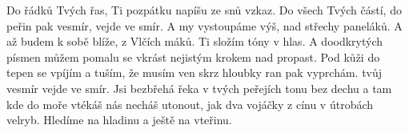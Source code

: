 \ve{}
Do řádků Tvých řas,
Ti pozpátku napíšu ze snů vzkaz.
Do všech Tvých částí,
do peřin pak vesmír,
vejde ve smír.
\cho{}
A my vystoupáme výš,
nad střechy paneláků.
A až budem k sobě blíže,
z Vlčích máků. Ti složím tóny v hlas.
A doodkrytých písmen
můžem pomalu se vkrást
nejistým krokem nad propast.
\ve{}
Pod kůži do tepen
se vpíjím a tuším,
že musím ven
skrz hloubky ran pak vyprchám.
tvůj vesmír
vejde ve smír.
\cho{}
\ve{}
Jsi bezbřehá řeka v tvých peřejích tonu bez dechu
a tam kde do moře vtékáš nás necháš utonout,
jak dva vojáčky z cínu v útrobách velryb.
Hledíme na hladinu a ještě na vteřinu.
\cho{}
\esong{}